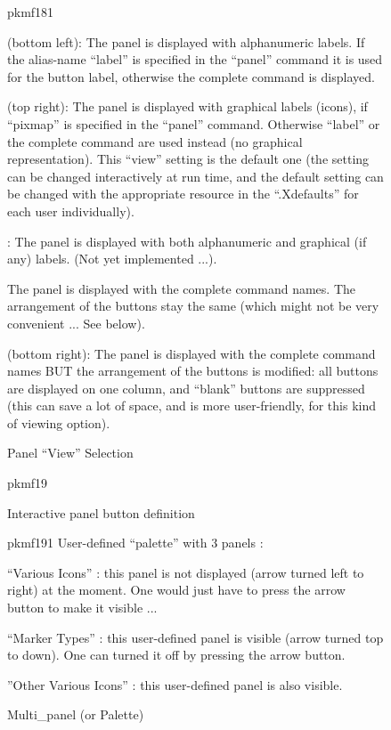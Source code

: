\begin{figure}
\begin{PICTf}[.53]{pkmf181}
\small\begin{DLsf}{}
\item {} (bottom left):
The panel is displayed with alphanumeric labels. If the alias-name ``label''
is specified in the ``panel'' command it is used for the button label,
otherwise the complete command is displayed.
\item {} (top right):
The panel is displayed with graphical labels (icons), if ``pixmap''
is specified in the ``panel'' command. Otherwise ``label'' or the
complete command are used instead (no graphical representation).
This ``view'' setting is the default one (the setting can be changed
interactively at run time, and the default setting can be changed
with the appropriate resource in the ``.Xdefaults'' for each user
individually).
\item {}:
The panel is displayed with both alphanumeric and graphical (if
any) labels.  (Not yet implemented ...).
\item {}
The panel is displayed with the complete command names. The arrangement
of the buttons stay the same (which might not be very convenient ...
See below).
\item {} (bottom right):
The panel is displayed with the complete command names BUT
the arrangement of the buttons is modified: all buttons are displayed
on one column, and ``blank'' buttons are suppressed (this can save
a lot of space, and is more user-friendly, for this kind of
viewing option).
\end{DLsf}
\end{PICTf}
\caption{Panel ``View'' Selection}
\label{ref:FIGPKMF181}

\medskip
\begin{minipage}{.35\textwidth}
\begin{PICTf}[.8]{pkmf19}
\end{PICTf}
\caption{Interactive panel button definition
\label{fig-panel-button}}
\end{minipage}\hfill
\begin{minipage}{.35\textwidth}
\begin{PICTf}[.4]{pkmf191}
\small User-defined ``palette'' with 3 panels :
\begin{DLsf}{}
\item ``Various Icons'' : this panel is not displayed (arrow turned left
to right) at the moment. One would just have to press the arrow button
to make it visible ...
\item ``Marker Types'' : this user-defined panel is visible (arrow turned
top to down). One can turned it off by pressing the arrow button.
\item ''Other Various Icons'' : this user-defined panel is also visible.
\end{DLsf}
\end{PICTf}
\caption{Multi\_panel (or Palette)}
\label{ref:FIGPKMF191}
\end{minipage}\hfill
\end{figure}

